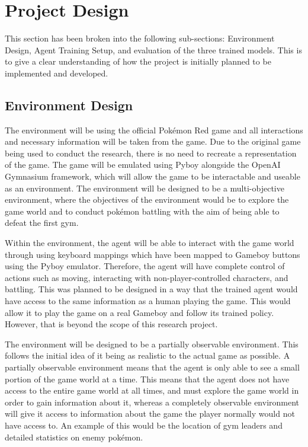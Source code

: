 \section{Project Design}

This section has been broken into the following sub-sections: Environment Design, Agent Training Setup, and evaluation of the three trained models. This is to give a clear understanding of how the project is initially planned to be implemented and developed.

\subsection{Environment Design}

The environment will be using the official Pokémon Red game and all interactions and necessary information will be taken from the game. Due to the original game being used to conduct the research, there is no need to recreate a representation of the game. The game will be emulated using Pyboy alongside the OpenAI Gymnasium framework, which will allow the game to be interactable and useable as an environment. The environment will be designed to be a multi-objective environment, where the objectives of the environment would be to explore the game world and to conduct pokémon battling with the aim of being able to defeat the first gym. 

Within the environment, the agent will be able to interact with the game world through using keyboard mappings which have been mapped to Gameboy buttons using the Pyboy emulator. Therefore, the agent will have complete control of actions such as moving, interacting with non-player-controlled characters, and battling. This was planned to be designed in a way that the trained agent would have access to the same information as a human playing the game. This would allow it to play the game on a real Gameboy and follow its trained policy. However, that is beyond the scope of this research project.

The environment will be designed to be a partially observable environment. This follows the initial idea of it being as realistic to the actual game as possible. A partially observable environment means that the agent is only able to see a small portion of the game world at a time. This means that the agent does not have access to the entire game world at all times, and must explore the game world in order to gain information about it, whereas a completely observable environment will give it access to information about the game the player normally would not have access to. An example of this would be the location of gym leaders and detailed statistics on enemy pokémon. 

